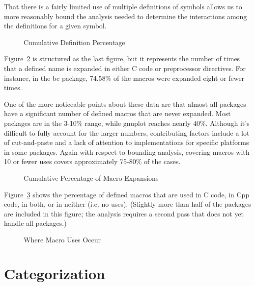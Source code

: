 That there is a fairly limited use of multiple definitions of symbols
allows us to more reasonably bound the analysis needed to determine
the interactions among the definitions for a given symbol.

\begin{figure}
{\small
  \setlength{\tabcolsep}{.25em}
}
\caption{Cumulative Definition Percentage\label{fig:define_count}}
\end{figure}

Figure~\ref{fig:use_count} is structured as the last figure, but it
represents the number of times that a defined name is expanded in
either C code or preprocessor directives.  For instance, in the bc
package, 74.58\% of the macros were expanded eight or fewer times.

One of the more noticeable points about these data are that almost all
packages have a significant number of defined macros that are never
expanded.  Most packages are in the 3-10\% range, while gnuplot
reaches nearly 40\%.  Although it's difficult to fully account for the
larger numbers, contributing factors include a lot of cut-and-paste
and a lack of attention to implementations for specific platforms in
some packages.  Again with respect to bounding analysis, covering
macros with 10 or fewer uses covers approximately 75-80\% of the cases.

\begin{figure}
{\small
  \setlength{\tabcolsep}{.25em}
}
\caption{Cumulative Percentage of Macro Expansions\label{fig:use_count}}
\end{figure}

Figure~\ref{fig:define_usage} shows the percentage of defined macros
that are used in C code, in Cpp code, in both, or in neither (i.e. no
uses).  (Slightly more than half of the packages are included in this
figure; the analysis requires a second pass that does not yet handle
all packages.)

\begin{figure}
\vspace{4.5in}
\caption{Where Macro Uses Occur\label{fig:define_usage}}
\end{figure}


\section{Categorization}\label{sec:categorization}

